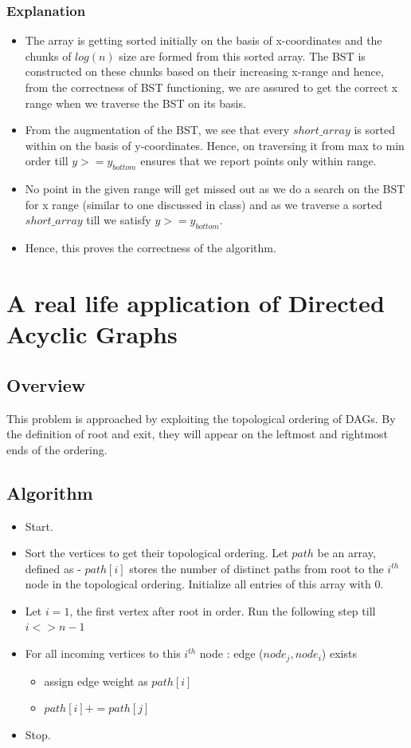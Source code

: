 \documentclass{article}
\begin{document}
\subsubsection{Explanation}
\begin{itemize}
\item The array is getting sorted initially on the basis of x-coordinates and the chunks of $log(n)$ size are formed from this sorted array. The BST is constructed on these chunks based on their increasing x-range and hence, from the correctness of BST functioning, we are assured to get the correct x range when we traverse the BST on its basis.
\item From the augmentation of the BST, we see that every $short\_array$ is sorted within on the basis of y-coordinates. Hence, on traversing it from max to min order till $y>=y_{bottom}$ ensures that we report points only within range.
\item No point in the given range will get missed out as we do a search on the BST for x range (similar to one discussed in class) and as we traverse a sorted $short\_array$ till we satisfy $y>=y_{bottom}$. 
\item Hence, this proves the correctness of the algorithm. 
\end{itemize}
\newpage
\section{A real life application of Directed Acyclic Graphs}
\subsection{Overview}
This problem is approached by exploiting the topological ordering of DAGs. By the definition of root and exit, they will appear on the leftmost and rightmost ends of the ordering.
\subsection{Algorithm}
\begin{itemize}
\item Start.
\item Sort the vertices to get their topological ordering. Let $path$ be an array, defined as - $path[i]$ stores the number of distinct paths from root to the $i^{th}$ node in the topological ordering. Initialize all entries of this array with $0$.
\item Let $i = 1$, the first vertex after root in order. Run the following step till $i <> n-1$
\item For all incoming vertices to this $i^{th}$ node : edge ($node_j, node_i$) exists
\begin{itemize}
\item assign edge weight as $path[i]$
\item $path[i] += path[j]$
\end{itemize} 
\item Stop.
\end{itemize}
\end{document}
